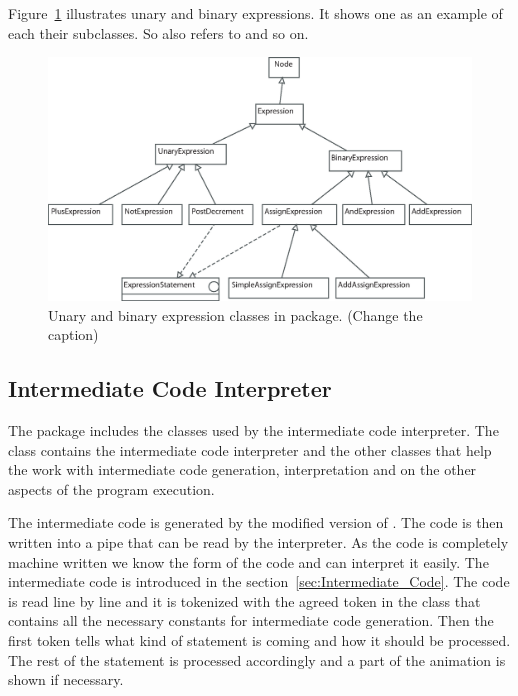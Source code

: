 Figure~\ref{fig:un_and_bin_exp_classes} illustrates unary and binary expressions. It shows one as an example of each their subclasses. So  also refers to  and so on.

\begin{figure}[!htb]
\begin{center}
\includegraphics[width=\textwidth]{images/unary-bin-exps.eps}
\caption{Unary and binary expression classes in  package. (Change the caption)}
\label{fig:un_and_bin_exp_classes}
\end{center}
\end{figure}

\subsection{Intermediate Code Interpreter}
\label{sec:Intermediate_Code_Interpreter}

The package  includes the classes used by the intermediate code interpreter. The class  contains the intermediate code interpreter and the other classes that  help the work with intermediate code generation, interpretation and on the other aspects of the program execution.

The intermediate code is generated by the modified version of \djava{}. The code is then written into a pipe that can be read by the interpreter. As the code is completely machine written we know the form of the code and can interpret it easily. The intermediate code is introduced in the section~\ref{sec:Intermediate_Code}. The code is read line by line and it is tokenized with the agreed token in the class  that contains all the necessary constants for intermediate code generation. Then the first token tells what kind of statement is coming and how it should be processed. The rest of the statement is processed accordingly and a part of the animation is shown if necessary.

